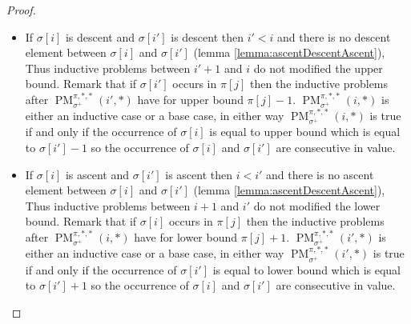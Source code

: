 \documentclass[a4paper]{llncs}
\newcommand{\ptext}{\pi}
\newcommand{\pmotif}{\sigma}
\newcommand{\pbmotif}{\pmotif^+}
\DeclareMathOperator{\PMa}{PM}
\newcommand{\PM}[6]{\PMa_{{#1}}^{{#2},{#3},{#4}}({#5},{#6})}
\begin{document}
\begin{proof}
\begin{itemize}
\begin{itemize}
			\item If $\pmotif[i]$ is descent and $\pmotif[i']$ is descent then $i'<i$ and there is no descent element between $\pmotif[i]$ and $\pmotif[i']$ (lemma \ref{lemma:ascentDescentAscent}), Thus inductive problems between $i'+1$ and $i$ do not modified the upper bound. Remark that if $\pmotif[i']$ occurs in $\ptext[j]$ then 
			the inductive problems after $\PM{\pbmotif}{\ptext}{*}{*}{i'}{*}$ have for upper bound $\ptext[j]-1$. $\PM{\pbmotif}{\ptext}{*}{*}{i}{*}$ is either an inductive case or a base case, in either way  $\PM{\pbmotif}{\ptext}{*}{*}{i}{*}$ is true if and only if the occurrence of $\sigma[i]$ is equal to upper bound which is equal to $\sigma[i']-1$ so the occurrence of $\pmotif[i]$ and $\pmotif[i']$ are consecutive in value.
			
			\item If $\pmotif[i]$ is ascent and $\pmotif[i']$ is ascent then $i<i'$ and there is no ascent element between $\pmotif[i]$ and $\pmotif[i']$ (lemma \ref{lemma:ascentDescentAscent}), Thus inductive problems between $i+1$ and $i'$ do not modified the lower bound. Remark that if $\pmotif[i]$ occurs in $\ptext[j]$ then 
			the inductive problems after $\PM{\pbmotif}{\ptext}{*}{*}{i}{*}$ have for lower bound $\ptext[j]+1$. $\PM{\pbmotif}{\ptext}{*}{*}{i'}{*}$ is either an inductive case or a base case, in either way  $\PM{\pbmotif}{\ptext}{*}{*}{i'}{*}$ is true if and only if the occurrence of $\sigma[i']$ is equal to lower bound which is equal to $\sigma[i']+1$ so the occurrence of $\pmotif[i]$ and $\pmotif[i']$ are consecutive in value.
		\end{itemize}
	
	
	
	
	
	
	
\end{itemize}

\end{proof}
\end{document}
